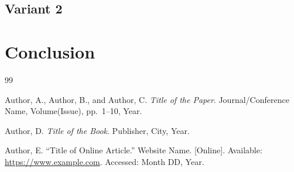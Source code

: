 \documentclass[12pt, a4paper]{article}
\begin{document}
\subsection{Variant 2}
\lipsum[18]

\section{Conclusion}

\lipsum[19]

\newpage
\begin{thebibliography}{99}

Author, A., Author, B., and Author, C.
\textit{Title of the Paper}.
Journal/Conference Name, Volume(Issue), pp.\ 1--10, Year.

Author, D.
\textit{Title of the Book}.
Publisher, City, Year.

Author, E.
``Title of Online Article.''
Website Name. [Online].
Available: \url{https://www.example.com}.
Accessed: Month DD, Year.

\end{thebibliography}
\end{document}
